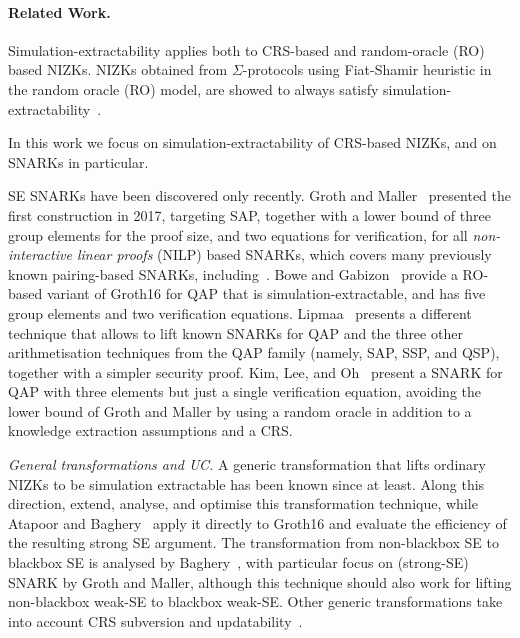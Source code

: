 \documentclass[a4paper, 11pt]{article}
\newcommand{\MK}[1]{}
\newcommand{\Gro}{\textsf{Groth16}}
\begin{document}


\paragraph{Related Work.}
 Simulation-extractability applies both to CRS-based and random-oracle (RO)
 based NIZKs. NIZKs obtained from
 $\Sigma$-protocols using Fiat-Shamir heuristic in the random oracle
 (RO) model, are showed to always satisfy
 simulation-extractability~\cite{DBLP:conf/indocrypt/FaustKMV12}.
 \MK{I suspect both Mary and I are working on this already, no need to make it
   even more apparent that this is interesting territory :): Although
 this result does not immediately extend to other FS-transformed
 NIZKs,}
 In this work we focus on simulation-extractability of
 CRS-based NIZKs, and on SNARKs in particular.

 SE SNARKs have been discovered only recently. Groth and
 Maller~\cite{gm17} presented the first construction in 2017,
 targeting SAP, together with a lower bound of three group elements for
 the proof size, and two equations for verification, for all
 \emph{non-interactive linear proofs} (NILP) based SNARKs, which covers many
 previously known pairing-based SNARKs, including~\cite{gro16,gm17}. Bowe and Gabizon~\cite{bowe2018making} provide a
 RO-based variant of \Gro{} for QAP that is simulation-extractable,
 and has five group elements and two verification
 equations. Lipmaa~\cite{lip19} presents a different technique that
 allows to lift known SNARKs for QAP and the three other arithmetisation
 techniques from the QAP family (namely, SAP, SSP, and QSP), together
 with a simpler security proof.\MK{Doesn't he do QAP as well?} Kim, Lee, and Oh~\cite{kim2019qap}
 present a SNARK for QAP with three elements but just a single
 verification equation, avoiding the lower bound of Groth and Maller
 by using a random oracle in addition to a knowledge extraction
 assumptions and a CRS.\smallskip

 \noindent\emph{General transformations and UC.} A generic
 transformation that lifts ordinary NIZKs to be simulation extractable
 has been known since \cite{de2001robust} at least. Along this
 direction, \cite{kosba2015use, kosba2015c} extend, analyse, and
 optimise this transformation technique, while Atapoor and
 Baghery~\cite{atapoor2019simulation} apply it directly to \Gro{} and
 evaluate the efficiency of the resulting strong SE argument. The
 transformation from non-blackbox SE to blackbox SE is analysed by
 Baghery~\cite{baghery2019efficiency}, with particular focus on
 (strong-SE) SNARK by Groth and Maller, although this technique should
 also work for lifting non-blackbox weak-SE to blackbox weak-SE. Other
 generic transformations take into account CRS subversion and
 updatability~\cite{abdolmaleki2020lift, bagherytiramisu}.
\end{document}
